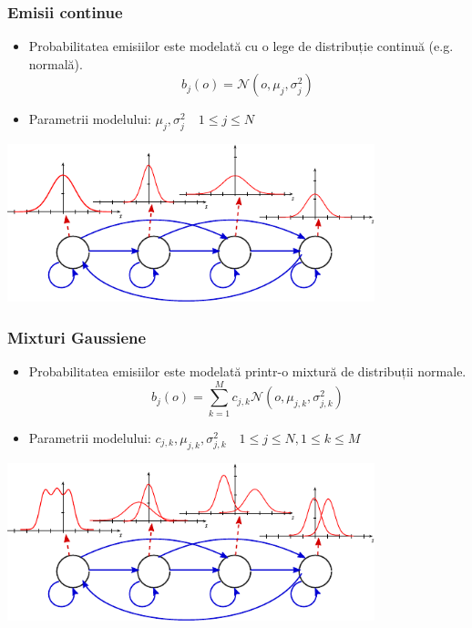 \begin{frame}
  \frametitle{Emisii continue}
  \begin{itemize}
  \item Probabilitatea emisiilor este modelată cu o lege de distribuție continuă (e.g. normală).
    \begin{equation}
      \label{eq:contin1}
      b_j(o) = \mathcal{N}(o,\mu_j,\sigma_{j}^{2})
    \end{equation}
  \item Parametrii modelului: $\mu_j,\sigma_{j}^{2}\quad 1 \le j \le N$
  \end{itemize}
  \vspace*{1em}
  \begin{center}
    \includegraphics[width=0.8\textwidth]{graphics/other-hmm/continuous.pdf}
  \end{center}
\end{frame}

\begin{frame}
  \frametitle{Mixturi Gaussiene}
  \begin{itemize}
  \item Probabilitatea emisiilor este modelată printr-o mixtură de distribuții normale.
    \begin{equation}
      \label{eq:contin2}
      b_j(o) = \displaystyle\sum_{k=1}^{M} c_{j,k}\mathcal{N}(o,\mu_{j,k},\sigma_{j,k}^2)
    \end{equation}
  \item Parametrii modelului: $c_{j,k},\mu_{j,k},\sigma_{j,k}^{2}\quad 1 \le j \le N, 1 \le k \le M$
  \end{itemize}
  \vspace*{1em}
  \begin{center}
    \includegraphics[width=0.8\textwidth]{graphics/other-hmm/mixture.pdf}
  \end{center}
\end{frame}

